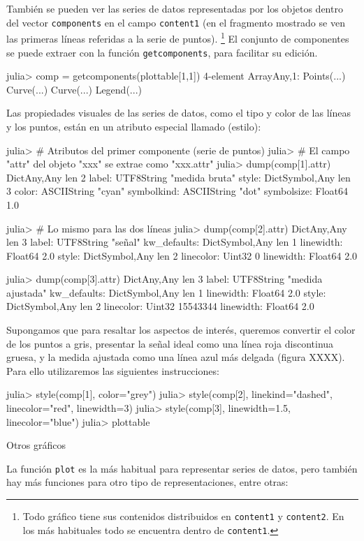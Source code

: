 ﻿\documentclass{article}
\newcommand{\jl}{\texttt}
\begin{document}
También se pueden ver las series de datos representadas por los objetos dentro del vector \jl{components} en el campo \jl{content1} (en el fragmento mostrado se ven las primeras líneas referidas a la serie de puntos).%
\footnote{%
Todo gráfico tiene sus contenidos distribuidos en \jl{content1} y
\jl{content2}. En los más habituales todo se encuentra dentro de
\jl{content1}.%
} 
El conjunto de componentes se puede extraer con la función \jl{getcomponents}, para facilitar su edición.

julia> comp = getcomponents(plottable[1,1])
4-element Array{Any,1}:
 Points(...)
 Curve(...) 
 Curve(...) 
 Legend(...)

Las propiedades visuales de las series de datos, como el tipo y color de las líneas y los puntos, están en un atributo especial llamado  (estilo):

julia> # Atributos del primer componente (serie de puntos)
julia> # El campo "attr" del objeto "xxx" se extrae como "xxx.attr"
julia> dump(comp[1].attr)
Dict{Any,Any} len 2
  label: UTF8String "medida bruta"
  style: Dict{Symbol,Any} len 3
    color: ASCIIString "cyan"
    symbolkind: ASCIIString "dot"
    symbolsize: Float64 1.0

julia> # Lo mismo para las dos líneas
julia> dump(comp[2].attr)
Dict{Any,Any} len 3
  label: UTF8String "señal"
  kw_defaults: Dict{Symbol,Any} len 1
    linewidth: Float64 2.0
  style: Dict{Symbol,Any} len 2
    linecolor: Uint32 0
    linewidth: Float64 2.0

julia> dump(comp[3].attr)
Dict{Any,Any} len 3
  label: UTF8String "medida ajustada"
  kw_defaults: Dict{Symbol,Any} len 1
    linewidth: Float64 2.0
  style: Dict{Symbol,Any} len 2
    linecolor: Uint32 15543344
    linewidth: Float64 2.0

Supongamos que para resaltar los aspectos de interés, queremos convertir el color de los puntos a gris, presentar la señal ideal como una línea roja discontinua gruesa, y la medida ajustada como una línea azul más delgada (figura XXXX). Para ello utilizaremos las siguientes instrucciones:

julia> style(comp[1], color="grey")
julia> style(comp[2], linekind="dashed", linecolor="red", linewidth=3)
julia> style(comp[3], linewidth=1.5, linecolor="blue")
julia> plottable

Otros gráficos

La función \jl{plot} es la más habitual para representar series de datos, pero también hay más funciones para otro tipo de representaciones, entre otras:
\end{document}
